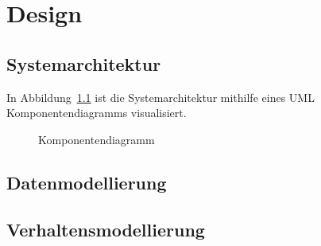 \chapter{Design}\label{ch:design}



\section{Systemarchitektur}\label{sec:systemarchitektur}


In Abbildung~\ref{fig:cmp} ist die Systemarchitektur mithilfe eines UML Komponentendiagramms
visualisiert.

\begin{figure}[h]
    \centering
    \caption{Komponentendiagramm}
    \label{fig:cmp}
\end{figure}

\section{Datenmodellierung}\label{sec:datenmodellierung}



\section{Verhaltensmodellierung}\label{sec:verhaltensmodellierung}


